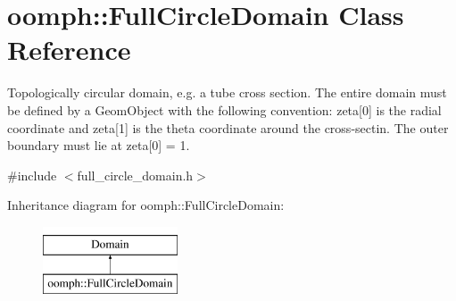 \hypertarget{classoomph_1_1FullCircleDomain}{}\section{oomph\+:\+:Full\+Circle\+Domain Class Reference}
\label{classoomph_1_1FullCircleDomain}


Topologically circular domain, e.\+g. a tube cross section. The entire domain must be defined by a Geom\+Object with the following convention\+: zeta\mbox{[}0\mbox{]} is the radial coordinate and zeta\mbox{[}1\mbox{]} is the theta coordinate around the cross-\/sectin. The outer boundary must lie at zeta\mbox{[}0\mbox{]} = 1.  




{\ttfamily \#include $<$full\+\_\+circle\+\_\+domain.\+h$>$}

Inheritance diagram for oomph\+:\+:Full\+Circle\+Domain\+:\begin{figure}[H]
\begin{center}
\leavevmode
\includegraphics[height=2.000000cm]{classoomph_1_1FullCircleDomain}
\end{center}
\end{figure}
